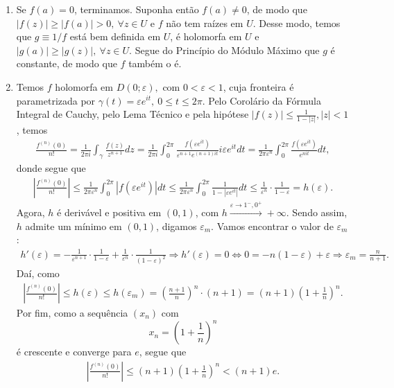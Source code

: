 \documentclass[12pt,a4paper]{article}
\begin{document}
\begin{enumerate}
		\item Se $f(a) = 0$, terminamos. Suponha então $f(a)\neq 0$, de modo que $|f(z)|\geq |f(a)| > 0, \ \forall z\in U$ e $f$ não tem raízes em $U$. Desse modo, temos que $g\equiv 1/f$ está bem definida em $U$, é holomorfa em $U$ e $|g(a)|\geq |g(z)|, \ \forall z\in U$. Segue do Princípio do Módulo Máximo que $g$ é constante, de modo que $f$ também o é.
		
		\item Temos $f$ holomorfa em $D(0;\varepsilon), \text{ com } 0 < \varepsilon < 1$, cuja fronteira é parametrizada por $\gamma(t) = \varepsilon e^{it}, \ 0\leq t\leq 2\pi$. Pelo Corolário da Fórmula Integral de Cauchy, pelo Lema Técnico e pela hipótese $\displaystyle{ |f(z)|\leq\frac{1}{1 - |z|}}, |z|<1$, temos
		\begin{align*}
		\frac{f^{(n)}(0)}{n!} = \frac{1}{2\pi i}\int_{\gamma}\frac{f(z)}{z^{n+1}}dz = \frac{1}{2\pi i}\int_{0}^{2\pi}\frac{f(\varepsilon e^{it})}{\varepsilon^{n+1}e^{(n+1)it}}i\varepsilon e^{it}dt = \frac{1}{2\pi\varepsilon^n}\int_{0}^{2\pi}\frac{f(\varepsilon e^{it})}{e^{nit}}dt,
		\end{align*}
		donde segue que
		\begin{align*}
		\left| \frac{f^{(n)}(0)}{n!} \right| \leq \frac{1}{2\pi\varepsilon^n}\int_{0}^{2\pi}|f(\varepsilon e^{it})|dt \leq \frac{1}{2\pi\varepsilon^n}\int_{0}^{2\pi}\frac{1}{1 - |\varepsilon e^{it}|}dt \leq \frac{1}{\varepsilon^n}\cdot\frac{1}{1-\varepsilon} = h(\varepsilon).
		\end{align*}
		Agora, $h$ é derivável e positiva em $(0,1)$, com $h\xrightarrow{\varepsilon \to 1^{-}, 0^{+}} +\infty$. Sendo assim, $h$ admite um mínimo em $(0,1)$, digamos $\varepsilon_m$. Vamos encontrar o valor de $\varepsilon_m$:
		\begin{align*}
		h'(\varepsilon) = -\frac{1}{\varepsilon^{n+1}}\cdot\frac{1}{1 - \varepsilon} + \frac{1}{\varepsilon^n}\cdot\frac{1}{(1-\varepsilon)^2} \Longrightarrow h'(\varepsilon) = 0 \iff 0 = -n(1-\varepsilon) + \varepsilon \Longrightarrow \varepsilon_m = \frac{n}{n+1}.
		\end{align*}
		Daí, como
		\begin{align*}
		\left| \frac{f^{(n)}(0)}{n!} \right| \leq h(\varepsilon) \leq h(\varepsilon_m) = \left(\frac{n+1}{n}\right)^n\cdot(n+1) = (n+1)\left( 1 + \frac{1}{n} \right)^n.
		\end{align*}
		Por fim, como a sequência $(x_n)$ com
		$$
		x_n = \left( 1+\frac{1}{n} \right)^n
		$$
		é crescente e converge para $e$, segue que
		\begin{align*}
		\left| \frac{f^{(n)}(0)}{n!} \right| \leq (n+1)\left( 1 + \frac{1}{n} \right)^n < (n+1)e.
		\end{align*}
		

\end{enumerate}
\end{document}
